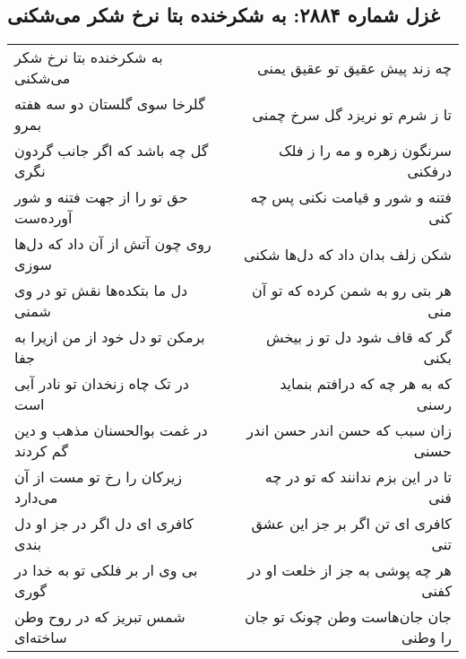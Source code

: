 \begin{center}
\section*{غزل شماره ۲۸۸۴: به شکرخنده بتا نرخ شکر می‌شکنی}
\label{sec:2884}
\begin{longtable}{l p{0.5cm} r}
به شکرخنده بتا نرخ شکر می‌شکنی
&&
چه زند پیش عقیق تو عقیق یمنی
\\
گلرخا سوی گلستان دو سه هفته بمرو
&&
تا ز شرم تو نریزد گل سرخ چمنی
\\
گل چه باشد که اگر جانب گردون نگری
&&
سرنگون زهره و مه را ز فلک درفکنی
\\
حق تو را از جهت فتنه و شور آورده‌ست
&&
فتنه و شور و قیامت نکنی پس چه کنی
\\
روی چون آتش از آن داد که دل‌ها سوزی
&&
شکن زلف بدان داد که دل‌ها شکنی
\\
دل ما بتکده‌ها نقش تو در وی شمنی
&&
هر بتی رو به شمن کرده که تو آن منی
\\
برمکن تو دل خود از من ازیرا به جفا
&&
گر که قاف شود دل تو ز بیخش بکنی
\\
در تک چاه زنخدان تو نادر آبی است
&&
که به هر چه که درافتم بنماید رسنی
\\
در غمت بوالحسنان مذهب و دین گم کردند
&&
زان سبب که حسن اندر حسن اندر حسنی
\\
زیرکان را رخ تو مست از آن می‌دارد
&&
تا در این بزم ندانند که تو در چه فنی
\\
کافری ای دل اگر در جز او دل بندی
&&
کافری ای تن اگر بر جز این عشق تنی
\\
بی وی ار بر فلکی تو به خدا در گوری
&&
هر چه پوشی به جز از خلعت او در کفنی
\\
شمس تبریز که در روح وطن ساخته‌ای
&&
جان جان‌هاست وطن چونک تو جان را وطنی
\\
\end{longtable}
\end{center}
